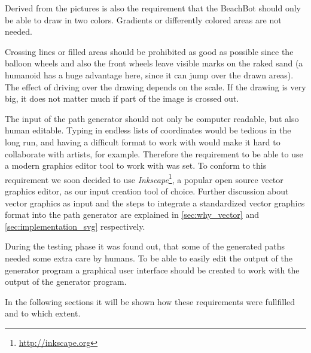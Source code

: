 Derived from the pictures is also the requirement that the BeachBot should only be able to draw in two colors. Gradients or differently colored areas are not needed.

Crossing lines or filled areas should be prohibited as good as possible since the balloon wheels and also the front wheels leave visible marks on the raked sand (a humanoid has a huge advantage here, since it can jump over the drawn areas). The effect of driving over the drawing depends on the scale. If the drawing is very big, it does not matter much if part of the image is crossed out. 

The input of the path generator should not only be computer readable, but also human editable. Typing in endless lists of coordinates would be tedious in the long run, and having a difficult format to work with would make it hard to collaborate with artists, for example. Therefore the requirement to be able to use a modern graphics editor tool to work with was set. To conform to this requirement we soon decided to use \textit{Inkscape}\footnote{\url{http://inkscape.org}}, a popular open source vector graphics editor, as our input creation tool of choice. Further discussion about vector graphics as input and the steps to integrate a standardized vector graphics format into the path generator are explained in \autoref{sec:why_vector} and \autoref{sec:implementation_svg} respectively.

During the testing phase it was found out, that some of the generated paths needed some extra care by humans. To be able to easily edit the output of the generator program a graphical user interface should be created to work with the output of the generator program. 

In the following sections it will be shown how these requirements were fullfilled and to which extent.